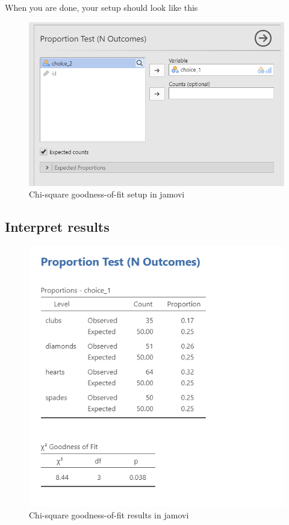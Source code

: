 \documentclass[
]{book}
\begin{document}
When you are done, your setup should look like this

\begin{figure}

{\centering \includegraphics[width=0.8\linewidth]{images/09-chi-square/chi-square_setup} 

}

\caption{Chi-square goodness-of-fit setup in jamovi}\label{fig:unnamed-chunk-1}
\end{figure}

\hypertarget{interpret-results-2}{%
\subsection{Interpret results}\label{interpret-results-2}}

\begin{figure}

{\centering \includegraphics[width=1\linewidth]{images/09-chi-square/chi-square_results} 

}

\caption{Chi-square goodness-of-fit results in jamovi}\label{fig:unnamed-chunk-2}
\end{figure}
\end{document}
